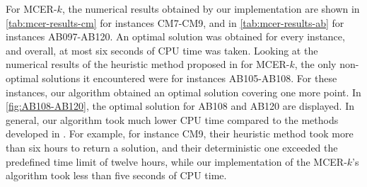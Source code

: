 For MCER-$k$, the numerical results obtained by our implementation are shown in \autoref{tab:mcer-results-cm} for instances CM7-CM9, and in \autoref{tab:mcer-results-ab} for instances AB097-AB120.
An optimal solution was obtained for every instance, and overall, at most six seconds of CPU time was taken.
Looking at the numerical results of the heuristic method proposed in \cite{andreta} for MCER-$k$, the only non-optimal solutions it encountered were for instances AB105-AB108. For these instances, our algorithm obtained an optimal solution covering one more point. In \autoref{fig:AB108-AB120}, the optimal solution for AB108 and AB120 are displayed.
In general, our algorithm took much lower CPU time compared to the methods developed in \cite{andreta}. For example, for instance CM9, their heuristic method took more than six hours to return a solution, and their deterministic one exceeded the predefined time limit of twelve hours, while our implementation of the MCER-$k$'s algorithm took less than five seconds of CPU time.

